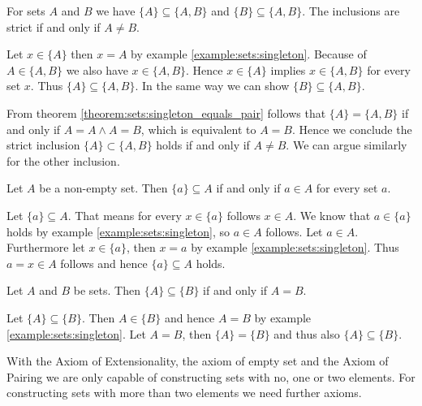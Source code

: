 \begin{examples}
    \begin{exampleenumerate}
        \item\label{example:sets:inclusion_pairs} For sets $A$ and $B$ we have $\{A\}\subseteq \{A,B\}$ and $\{B\}\subseteq \{A,B\}$. The inclusions are strict if and only if $A\neq B$.
        \begin{miniproof}
            Let $x\in \{A\}$ then $x=A$ by example \ref{example:sets:singleton}. Because of $A\in\{A,B\}$ we also have $x\in\{A,B\}$. Hence $x\in\{A\}$ implies $x\in\{A,B\}$ for every set $x$. Thus $\{A\}\subseteq\{A,B\}$. In the same way we can show $\{B\}\subseteq\{A,B\}$.

            From theorem \ref{theorem:sets:singleton_equals_pair} follows that $\{A\}=\{A,B\}$ if and only if $A=A\land A=B$, which is equivalent to $A=B$. Hence we conclude the strict inclusion $\{A\}\subset\{A,B\}$ holds if and only if $A\neq B$. We can argue similarly for the other inclusion.
        \end{miniproof}
        \item\label{example:sets:singleton_subset} Let $A$ be a non-empty set. Then $\{a\}\subseteq A$ if and only if $a\in A$ for every set $a$.
        \begin{miniproof}
            \proofright Let $\{a\}\subseteq A$. That means for every $x\in\{a\}$ follows $x\in A$. We know that $a\in\{a\}$ holds by example \ref{example:sets:singleton}, so $a\in A$ follows. \proofleft Let $a\in A$. Furthermore let $x\in \{a\}$, then $x=a$ by example \ref{example:sets:singleton}. Thus $a=x\in A$ follows and hence $\{a\}\subseteq A$ holds.
        \end{miniproof}
        \item\label{example:sets:singleton_subset_singleton} Let $A$ and $B$ be sets. Then $\{A\}\subseteq\{B\}$ if and only if $A=B$.
        \begin{miniproof}
            \proofright Let $\{A\}\subseteq\{B\}$. Then $A\in\{B\}$ and hence $A=B$ by example \ref{example:sets:singleton}. \proofleft Let $A=B$, then $\{A\}=\{B\}$ and thus also $\{A\}\subseteq\{B\}$.
        \end{miniproof}
    \end{exampleenumerate}
\end{examples}

With the Axiom of Extensionality, the axiom of empty set and the Axiom of Pairing we are only capable of constructing sets with no, one or two elements. For constructing sets with more than two elements we need further axioms.

